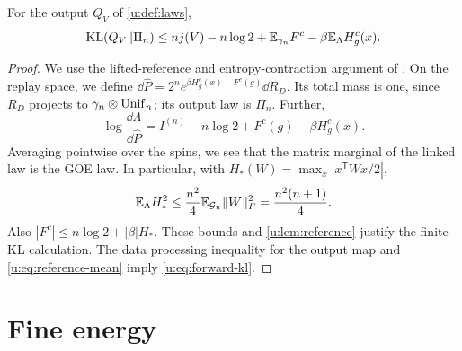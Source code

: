 \begin{lemma}\label{u:lem:forward-kl}
For the output $Q_V$ of \cref{u:def:laws},
\begin{equation}\label{u:eq:forward-kl}
 \operatorname{KL}(Q_V\Vert \Pi_n)\le n j(V)-n\log2+\mathbb E_{\gamma_n}F^c
                               -\beta\mathbb E_\Lambda H^c_g(x).
\end{equation}
\end{lemma}
\begin{proof}
We use the lifted-reference and entropy-contraction argument of
\cite[Section~4, proof of Proposition~5]{oai-typical-upper}.
On the replay space, we define
$\dd\widehat P=2^n e^{\beta H^c_g(x)-F^c(g)}\dd R_D$.
Its total mass is one, since $R_D$ projects to $\gamma_n\otimes\operatorname{Unif}_n$;
its output law is $\Pi_n$. Further,
\[
 \log\frac{\dd\Lambda}{\dd\widehat P}
      = I^{(n)}-n\log2+F^c(g)-\beta H^c_g(x).
\]
Averaging pointwise over the spins, we see that the matrix marginal
of the linked law is the GOE law. In particular, with $H_*(W)=\max_x|x^{\mathsf T}Wx/2|$,
\begin{equation}\label{u:eq:energy-integrability}
 \mathbb E_\Lambda H_*^2\le\frac{n^2}{4}\mathbb E_{\mathcal G_n}\|W\|_F^2
                =\frac{n^2(n+1)}4.
\end{equation}
Also $|F^c|\le n\log2+|\beta|H_*$. These bounds and \cref{u:lem:reference}
justify the finite KL calculation. The data processing inequality for the output
map \cite[Chapter~4, Exercise~4.10]{boucheron-lugosi-massart-2013}
and \eqref{u:eq:reference-mean} imply \eqref{u:eq:forward-kl}.
\end{proof}

\section{Fine energy}
\label{u:sec:fine-energy}

